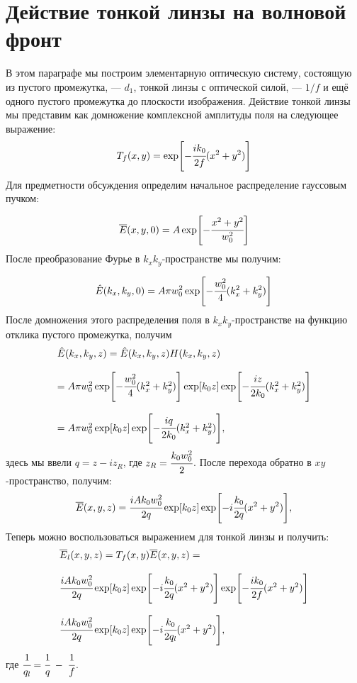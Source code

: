 \section{Действие тонкой линзы на волновой фронт}
В этом параграфе мы построим элементарную оптическую систему, состоящую из пустого промежутка, --- $d_1$, тонкой линзы с оптической силой, --- $1/f$ и ещё одного пустого промежутка до плоскости изображения. Действие тонкой линзы мы представим как домножение комплексной амплитуды поля на следующее выражение: 
\begin{equation}
	T_f(x, y) = \exp[-\cfrac{ik_0}{2f}(x^2 + y^2)]
\end{equation}
Для предметности обсуждения определим начальное распределение гауссовым пучком: 

\begin{equation}
	\overline{E}(x, y, 0) = A\exp[-\cfrac{x^2 + y^2}{w^2_0}]
\end{equation}
После преобразование Фурье в $k_xk_y$-пространстве мы получим:

\begin{equation}
	\hat{E}(k_x, k_y, 0) = A\pi w^2_0\exp[-\cfrac{w^2_0}{4}(k_x^2 + k_y^2)]
\end{equation}
После домножения этого распределения поля в $k_xk_y$-пространстве на функцию отклика пустого промежутка, получим
\begin{equation}
	\label{eq:after_lens}
	\begin{array}{lcl}
	\hat{E}(k_x, k_y, z) = \hat{E}(k_x, k_y, z)H(k_x, k_y, z) 
	\\
	\\
	= A\pi w^2_0\exp[-\cfrac{w^2_0}{4}(k_x^2 + k_y^2)]\exp[k_0z]\exp[-\cfrac{iz}{2k_0}(k^2_x + k^2_y)]
	\\
	\\
	= A\pi w^2_0\exp[k_0z]\exp[-\cfrac{iq}{2k_0}(k^2_x + k^2_y)], 
	\end{array}
\end{equation}
здесь мы ввели $q = z - iz_R$, где $z_R = \cfrac{k_0w^2_0}{2}$. После перехода обратно в $xy$-пространство, получим: 
\begin{equation}
	\overline{E}(x, y, z) = \cfrac{iAk_0w^2_0}{2q}\exp[k_0z]\exp[-i\cfrac{k_0}{2q}(x^2 + y^2)],
\end{equation}
Теперь можно воспользоваться выражением для тонкой линзы и получить:
\begin{equation}
	\begin{array}{lcl}
	\overline{E}_{l}(x, y, z) = T_f(x, y)\overline{E}(x, y, z) = 
	\\
	\\
	\cfrac{iAk_0w^2_0}{2q}\exp[k_0z]\exp[-i\cfrac{k_0}{2q}(x^2 + y^2)]\exp[-\cfrac{ik_0}{2f}(x^2 + y^2)]
	\\
	\\
	\cfrac{iAk_0w^2_0}{2q}\exp[k_0z]\exp[-i\cfrac{k_0}{2q_l}(x^2 + y^2)],
	\end{array}
\end{equation}
где $\cfrac{1}{q_l} = \cfrac{1}{q} \; - \; \cfrac{1}{f}$. \\

